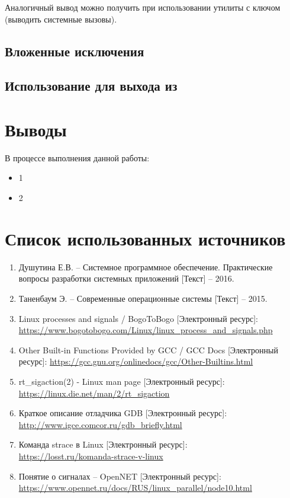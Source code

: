 Аналогичный вывод можно получить при использовании утилиты  с ключом  (выводить системные вызовы).



\subsection{Вложенные исключения}

\subsection{Использование  для выхода из }

\section{Выводы}

В процессе выполнения данной работы:

\begin{itemize}
	\item 1
	\item 2
\end{itemize}

\newpage

\section*{Список использованных источников}

\begin{enumerate}
	\item Душутина Е.В. -- Системное программное обеспечение. Практические вопросы разработки системных приложений [Текст] -- 2016.
	\item Таненбаум Э. -- Современные операционные системы [Текст] -- 2015.
	\item Linux processes and signals / BogoToBogo [Электронный ресурс]:\\
		{\small\url{https://www.bogotobogo.com/Linux/linux_process_and_signals.php}}
	\item Other Built-in Functions Provided by GCC / GCC Docs [Электронный ресурс]:
		{\small\url{https://gcc.gnu.org/onlinedocs/gcc/Other-Builtins.html}}
	\item rt\_sigaction(2) - Linux man page [Электронный ресурс]:\\
		{\small\url{https://linux.die.net/man/2/rt_sigaction}}
	\item Краткое описание отладчика GDB [Электронный ресурс]:\\
		{\small\url{http://www.igce.comcor.ru/gdb_briefly.html}}
	\item Команда strace в Linux [Электронный ресурс]:\\
		{\small\url{https://losst.ru/komanda-strace-v-linux}}
	\item Понятие о сигналах -- OpenNET [Электронный ресурс]:\\
		{\small\url{https://www.opennet.ru/docs/RUS/linux_parallel/node10.html}}
\end{enumerate}


